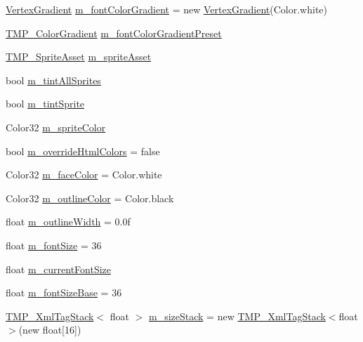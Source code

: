 \begin{DoxyCompactItemize}
\mbox{\hyperlink{struct_t_m_pro_1_1_vertex_gradient}{Vertex\+Gradient}} \mbox{\hyperlink{class_t_m_pro_1_1_t_m_p___text_ac424609fe2089736a5a46dfaf38e7d29}{m\+\_\+font\+Color\+Gradient}} = new \mbox{\hyperlink{struct_t_m_pro_1_1_vertex_gradient}{Vertex\+Gradient}}(Color.\+white)
\item 
\mbox{\hyperlink{class_t_m_pro_1_1_t_m_p___color_gradient}{T\+M\+P\+\_\+\+Color\+Gradient}} \mbox{\hyperlink{class_t_m_pro_1_1_t_m_p___text_a11bac227cb5d775ab2c2ec05bd38efd8}{m\+\_\+font\+Color\+Gradient\+Preset}}
\item 
\mbox{\hyperlink{class_t_m_pro_1_1_t_m_p___sprite_asset}{T\+M\+P\+\_\+\+Sprite\+Asset}} \mbox{\hyperlink{class_t_m_pro_1_1_t_m_p___text_ab0cf13ef236561a0dc06f50b20d1dfd2}{m\+\_\+sprite\+Asset}}
\item 
bool \mbox{\hyperlink{class_t_m_pro_1_1_t_m_p___text_a47b8457257b21bcadf691626c8652424}{m\+\_\+tint\+All\+Sprites}}
\item 
bool \mbox{\hyperlink{class_t_m_pro_1_1_t_m_p___text_aa631d1d794bc4311dab3bd59a93da3a8}{m\+\_\+tint\+Sprite}}
\item 
Color32 \mbox{\hyperlink{class_t_m_pro_1_1_t_m_p___text_a272cd032433d4e3ee89dc87a1906e868}{m\+\_\+sprite\+Color}}
\item 
bool \mbox{\hyperlink{class_t_m_pro_1_1_t_m_p___text_a52dfbd8d5fcc873fa38b60fe266c391e}{m\+\_\+override\+Html\+Colors}} = false
\item 
Color32 \mbox{\hyperlink{class_t_m_pro_1_1_t_m_p___text_ac5d937484edbc8c25cd5d0c0b2744e49}{m\+\_\+face\+Color}} = Color.\+white
\item 
Color32 \mbox{\hyperlink{class_t_m_pro_1_1_t_m_p___text_ac32269a6458622a4ca269f84058839b2}{m\+\_\+outline\+Color}} = Color.\+black
\item 
float \mbox{\hyperlink{class_t_m_pro_1_1_t_m_p___text_aed9637dab11ebe72893ad777fdf9aa2a}{m\+\_\+outline\+Width}} = 0.\+0f
\item 
float \mbox{\hyperlink{class_t_m_pro_1_1_t_m_p___text_aed25c99dae9e95eb2384ab6d3cbf9505}{m\+\_\+font\+Size}} = 36
\item 
float \mbox{\hyperlink{class_t_m_pro_1_1_t_m_p___text_a897404d7f80b8fa3542db13771cfed90}{m\+\_\+current\+Font\+Size}}
\item 
float \mbox{\hyperlink{class_t_m_pro_1_1_t_m_p___text_a79c4e834e1ec2575cc80974e1220d871}{m\+\_\+font\+Size\+Base}} = 36
\item 
\mbox{\hyperlink{struct_t_m_pro_1_1_t_m_p___xml_tag_stack}{T\+M\+P\+\_\+\+Xml\+Tag\+Stack}}$<$ float $>$ \mbox{\hyperlink{class_t_m_pro_1_1_t_m_p___text_adab7fa99845b471b539790ea7b647755}{m\+\_\+size\+Stack}} = new \mbox{\hyperlink{struct_t_m_pro_1_1_t_m_p___xml_tag_stack}{T\+M\+P\+\_\+\+Xml\+Tag\+Stack}}$<$float$>$(new float\mbox{[}16\mbox{]})

\end{DoxyCompactItemize}
